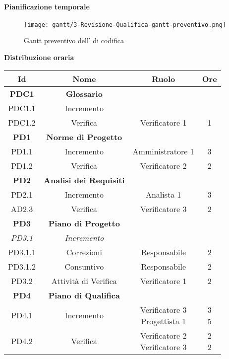 \documentclass{scalatekids-article}
\begin{document}
\newpage
\paragraph{Pianificazione temporale}
\begin{figure}[H]
  \texttt{[image: gantt/3-Revisione-Qualifica-gantt-preventivo.png]}
  \caption{Gantt preventivo dell' di codifica}
\end{figure}

\newpage
\textbf{Distribuzione oraria}
\scriptsize
\begin{center}
  \begin{tabular}{| c | c | c | c |}
    \hline
    \textbf{Id} & \textbf{Nome} & \textbf{Ruolo} & \textbf{Ore}\\
    \hline
    \textbf{PDC1} & \textbf{Glossario} & &\\
    \hline
    PDC1.1 & Incremento &  &\\
    \hline
    PDC1.2 & Verifica & Verificatore 1 & 1\\
    \hline
    \textbf{PD1} & \textbf{Norme di Progetto} & &\\
    \hline
    PD1.1 & Incremento & Amministratore 1 & 3\\
    \hline
    PD1.2 & Verifica & Verificatore 2 & 2\\
    \hline
    \textbf{PD2} & \textbf{Analisi dei Requisiti} & &\\
    \hline
    PD2.1 & Incremento & Analista 1 & 3\\
    \hline
    AD2.3 & Verifica & Verificatore 3 & 2\\
    \hline
    \textbf{PD3} & \textbf{Piano di Progetto} & &\\
    \hline
    \textit{PD3.1} & \textit{Incremento} & &\\
    \hline
    PD3.1.1 & Correzioni & Responsabile & 2\\
    \hline
    PD3.1.2 & Consuntivo & Responsabile & 2\\
    \hline
    PD3.2 & Attività di Verifica & Verificatore 1 & 2\\
    \hline
    \textbf{PD4} & \textbf{Piano di Qualifica} & &\\
    \hline
    PD4.1 & Incremento & \multiLineCell[t]{Verificatore 3\\Progettista 1} & \multiLineCell[t]{3\\5}\\
    \hline
    PD4.2 & Verifica & \multiLineCell[t]{Verificatore 2\\Verificatore 3} & \multiLineCell[t]{2\\2}\\

\end{tabular}
\end{center}
\end{document}
